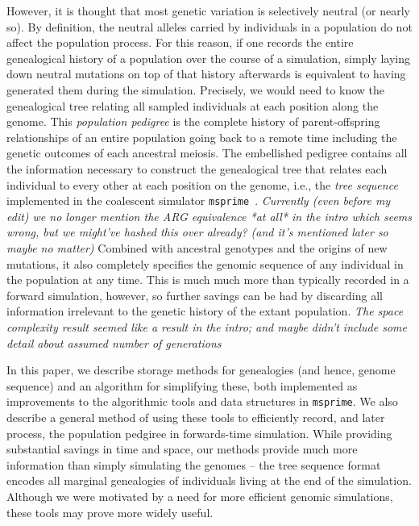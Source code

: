 \documentclass{article}
\newcommand{\msprime}{\texttt{msprime}}
\newcommand{\jda}[1]{{\em \color{cyan} #1}}
\begin{document}
However, it is thought that most genetic variation is selectively neutral (or nearly so).
By definition, the neutral alleles carried by individuals in a population
do not affect the population process.
For this reason, if one records the entire genealogical history of a population over the course of a simulation,
simply laying down neutral mutations on top of that history afterwards
is equivalent to having generated them during the simulation.
Precisely, we would need to know the genealogical tree relating all sampled individuals
at each position along the genome.
This \emph{population pedigree} is 
the complete history of parent-offspring relationships of an entire population
going back to a remote time including the genetic outcomes of each ancestral
meiosis.
The embellished pedigree contains all the information necessary
to construct the genealogical tree that relates each individual to every other
at each position on the genome,
i.e., the \emph{tree sequence} implemented in the coalescent simulator \msprime{}~\citep{kelleher2016efficient}.
\jda{Currently (even before my edit) we no longer mention the ARG equivalence *at all* in the intro which
	seems wrong, but we might've hashed this over already? (and it's
	mentioned later so maybe no matter)}
Combined with ancestral genotypes and the origins of new mutations,
it also completely specifies the genomic sequence of any individual in the population at any time.
This is much much more than typically recorded in a forward simulation, however,
so further savings can be had by discarding all information irrelevant to the genetic history
of the extant population.
\jda{The space complexity result seemed like a result in the intro; and maybe didn't include some detail
	about assumed number of generations}

In this paper, we describe storage methods for genealogies
(and hence, genome sequence) and an algorithm for simplifying these,
both implemented as improvements to the algorithmic tools and data structures in \msprime{}.
We also describe a general method of using these tools to efficiently record,
and later process, the population pedgiree in forwards-time simulation.
While providing substantial savings in time and space, our methods provide much
more information than simply simulating the genomes -- the tree sequence format
encodes all marginal genealogies of individuals living at the end of the
simulation.
Although we were motivated by a need for more efficient genomic simulations,
these tools may prove more widely useful.


\end{document}
